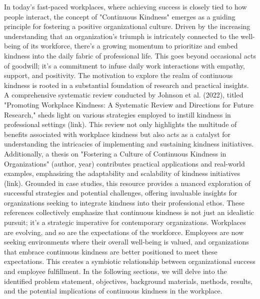\documentclass[a4paper, 11pt]{report}
\begin{document}
In today's fast-paced workplaces, where achieving success is closely tied to how people interact, the concept of "Continuous Kindness" emerges as a guiding principle for fostering a positive organizational culture. Driven by the increasing understanding that an organization's triumph is intricately connected to the well-being of its workforce, there's a growing momentum to prioritize and embed kindness into the daily fabric of professional life. This goes beyond occasional acts of goodwill; it's a commitment to infuse daily work interactions with empathy, support, and positivity.
\vspace{5mm} %
\newline
The motivation to explore the realm of continuous kindness is rooted in a substantial foundation of research and practical insights. A comprehensive systematic review conducted by Johnson et al. (2022), titled "Promoting Workplace Kindness: A Systematic Review and Directions for Future Research," sheds light on various strategies employed to instill kindness in professional settings (link). This review not only highlights the multitude of benefits associated with workplace kindness but also acts as a catalyst for understanding the intricacies of implementing and sustaining kindness initiatives.
\vspace{5mm} %
\newline
Additionally, a thesis on "Fostering a Culture of Continuous Kindness in Organizations" (author, year) contributes practical applications and real-world examples, emphasizing the adaptability and scalability of kindness initiatives (link). Grounded in case studies, this resource provides a nuanced exploration of successful strategies and potential challenges, offering invaluable insights for organizations seeking to integrate kindness into their professional ethos.
\vspace{5mm} %
\newline
These references collectively emphasize that continuous kindness is not just an idealistic pursuit; it's a strategic imperative for contemporary organizations. Workplaces are evolving, and so are the expectations of the workforce. Employees are now seeking environments where their overall well-being is valued, and organizations that embrace continuous kindness are better positioned to meet these expectations. This creates a symbiotic relationship between organizational success and employee fulfillment. In the following sections, we will delve into the identified problem statement, objectives, background materials, methods, results, and the potential implications of continuous kindness in the workplace.
\end{document}
